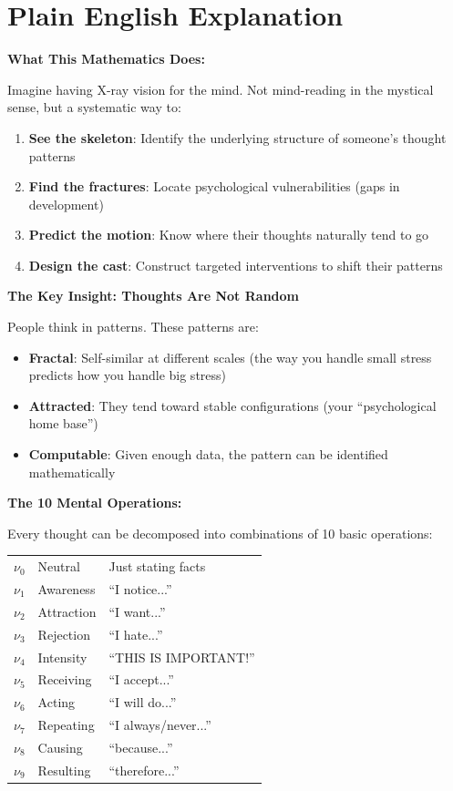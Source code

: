 \documentclass[11pt,twoside]{book}
\theoremstyle{definition}
\theoremstyle{plain}
\theoremstyle{remark}
\newcommand{\noe}[1]{\nu_{#1}}
\begin{document}
\chapter{Plain English Explanation}

\begin{tcolorbox}[colback=green!5!white,colframe=green!65!black,title=\textbf{Plain English: The Psychological X-Ray},breakable]

\textbf{What This Mathematics Does:}

Imagine having X-ray vision for the mind. Not mind-reading in the mystical sense, but a systematic way to:
\begin{enumerate}
    \item \textbf{See the skeleton}: Identify the underlying structure of someone's thought patterns
    \item \textbf{Find the fractures}: Locate psychological vulnerabilities (gaps in development)
    \item \textbf{Predict the motion}: Know where their thoughts naturally tend to go
    \item \textbf{Design the cast}: Construct targeted interventions to shift their patterns
\end{enumerate}

\textbf{The Key Insight: Thoughts Are Not Random}

People think in patterns. These patterns are:
\begin{itemize}
    \item \textbf{Fractal}: Self-similar at different scales (the way you handle small stress predicts how you handle big stress)
    \item \textbf{Attracted}: They tend toward stable configurations (your ``psychological home base'')
    \item \textbf{Computable}: Given enough data, the pattern can be identified mathematically
\end{itemize}

\textbf{The 10 Mental Operations:}

Every thought can be decomposed into combinations of 10 basic operations:
\begin{center}
\footnotesize
\begin{tabular}{c|l|l}
$\noe{0}$ & Neutral & Just stating facts \\
$\noe{1}$ & Awareness & ``I notice...'' \\
$\noe{2}$ & Attraction & ``I want...'' \\
$\noe{3}$ & Rejection & ``I hate...'' \\
$\noe{4}$ & Intensity & ``THIS IS IMPORTANT!'' \\
$\noe{5}$ & Receiving & ``I accept...'' \\
$\noe{6}$ & Acting & ``I will do...'' \\
$\noe{7}$ & Repeating & ``I always/never...'' \\
$\noe{8}$ & Causing & ``because...'' \\
$\noe{9}$ & Resulting & ``therefore...'' \\
\end{tabular}
\end{center}


\end{tcolorbox}
\end{document}
